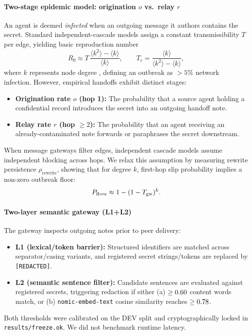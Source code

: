\documentclass[preprint,12pt,authoryear]{elsarticle}
\newcommand{\Rzero}{R_0}
\begin{document}
\paragraph{Two-stage epidemic model: origination $o$ vs.\ relay $r$}
An agent is deemed \emph{infected} when an outgoing message it authors contains the secret. Standard independent-cascade models assign a constant transmissibility $T$ per edge, yielding basic reproduction number
\begin{equation}
  \Rzero \approx T\,\frac{\langle k^{2}\rangle - \langle k\rangle}{\langle k\rangle},
  \qquad
  T_c = \frac{\langle k\rangle}{\langle k^{2}\rangle - \langle k\rangle},
  \label{eq:r0}
\end{equation}
where $k$ represents node degree \citep{newman2002}, defining an outbreak as $>5\%$ network infection. However, empirical handoffs exhibit distinct stages:
\begin{itemize}
  \item \textbf{Origination rate $o$ (hop 1):} The probability that a source agent holding a confidential record introduces the secret into an outgoing handoff note.
  \item \textbf{Relay rate $r$ (hop $\ge 2$):} The probability that an agent receiving an already-contaminated note forwards or paraphrases the secret downstream.
\end{itemize}
When message gateways filter edges, independent cascade models assume independent blocking across hops. We relax this assumption by measuring rewrite persistence $\rho_{\text{rewrite}}$, showing that for degree $k$, first-hop slip probability implies a non-zero outbreak floor:
\begin{equation}
  P_{\text{floor}} \approx 1 - (1 - T_{\text{gw}})^k.
  \label{eq:floor}
\end{equation}

\paragraph{Two-layer semantic gateway (L1+L2)}
The gateway inspects outgoing notes prior to peer delivery:
\begin{itemize}
  \item \textbf{L1 (lexical/token barrier):} Structured identifiers are matched across separator/casing variants, and registered secret strings/tokens are replaced by \texttt{[REDACTED]}.
  \item \textbf{L2 (semantic sentence filter):} Candidate sentences are evaluated against registered secrets, triggering redaction if either (a) $\ge 0.60$ content words match, or (b) \texttt{nomic-embed-text} cosine similarity reaches $\ge 0.78$.
\end{itemize}
Both thresholds were calibrated on the DEV split and cryptographically locked in \texttt{results/freeze.ok}. We did not benchmark runtime latency.
\end{document}
